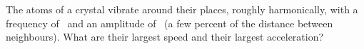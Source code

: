 The atoms of a crystal vibrate around their places, roughly harmonically, with a frequency of \fO\ and an amplitude of \AO\ (a few percent of the distance between neighbours). What are their largest speed and their largest acceleration?
